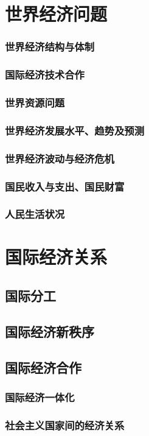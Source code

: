 \documentclass[UTF8]{../../RepresentationUniverse}
\begin{document}
\section{世界经济问题}
    \subsubsection{世界经济结构与体制}
    \subsubsection{国际经济技术合作}
    \subsubsection{世界资源问题}
    \subsubsection{世界经济发展水平、趋势及预测}
    \subsubsection{世界经济波动与经济危机}
    \subsubsection{国民收入与支出、国民财富}
    \subsubsection{人民生活状况}
\section{国际经济关系}
    \subsection{国际分工}
    \subsection{国际经济新秩序}
    \subsection{国际经济合作}
        \subsubsection{国际经济一体化}
        \subsubsection{社会主义国家间的经济关系}
\end{document}
